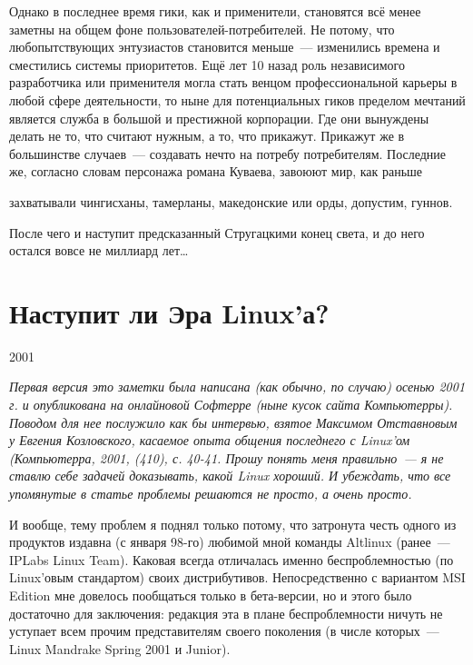 Однако в последнее время гики, как и применители, становятся всё менее заметны на общем фоне пользователей-потребителей. Не потому, что любопытствующих энтузиастов становится меньше~--- изменились времена и сместились системы приоритетов. Ещё лет 10 назад роль независимого разработчика или применителя могла стать венцом профессиональной карьеры в любой сфере деятельности, то ныне для потенциальных гиков пределом мечтаний является служба в большой и престижной корпорации. Где они вынуждены делать не то, что считают нужным, а то, что прикажут. Прикажут же в большинстве случаев~--- создавать нечто на потребу потребителям. Последние же, согласно словам персонажа романа Куваева, завоюют мир, как раньше
\begin{shadequote}{}
 захватывали чингисханы, тамерланы, македонские или орды, допустим, гуннов.
\end{shadequote}

После чего и наступит предсказанный Стругацкими конец света, и до него остался вовсе не миллиард лет\dots

\section{Наступит ли Эра Linux'а?} 

\begin{timeline}2001\end{timeline}

\textsl{Первая версия это заметки была написана (как обычно, по случаю) осенью 2001 г. и опубликована на онлайновой Софтерре (ныне кусок сайта Компьютерры). Поводом для нее послужило как бы интервью, взятое Максимом Отставновым у Евгения Козловского, касаемое опыта общения последнего с Linux'ом (Компьютерра, 2001,  (410), с. 40-41. Прошу понять меня правильно~--- я не ставлю себе задачей доказывать, какой Linux хороший. И убеждать, что все упомянутые в статье проблемы решаются не просто, а очень просто.}\medskip

И вообще, тему проблем я поднял только потому, что затронута честь одного из продуктов издавна (с января 98-го) любимой мной команды Altlinux (ранее~--- IPLabs Linux Team). Каковая всегда отличалась именно беспроблемностью (по Linux'овым стандартом) своих дистрибутивов. Непосредственно с вариантом MSI Edition мне довелось пообщаться только в бета-версии, но и этого было достаточно для заключения: редакция эта в плане беспроблемности ничуть не уступает всем прочим представителям своего поколения (в числе которых~--- Linux Mandrake Spring 2001 и Junior).

